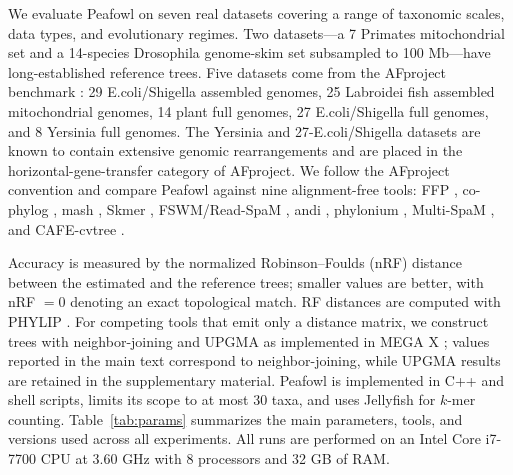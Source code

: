 \documentclass[11pt]{article}
\begin{document}
We evaluate Peafowl on seven real datasets covering a range of taxonomic
scales, data types, and evolutionary regimes. Two datasets---a 7 Primates
mitochondrial set and a 14-species Drosophila genome-skim set subsampled to
100 Mb---have long-established reference trees. Five datasets come from the
AFproject benchmark \citep{zielezinski2019afproject}: 29 E.coli/Shigella
assembled genomes, 25 Labroidei fish assembled mitochondrial genomes, 14
plant full genomes, 27 E.coli/Shigella full genomes, and 8 Yersinia full
genomes. The Yersinia and 27-E.coli/Shigella datasets are known to contain
extensive genomic rearrangements and are placed in the horizontal-gene-transfer
category of AFproject. We follow the AFproject convention and compare Peafowl
against nine alignment-free tools: FFP \citep{sims2009ffp}, co-phylog
\citep{yi2013cophylog}, mash \citep{ondov2016mash}, Skmer
\citep{sarmashghi2019skmer}, FSWM/Read-SpaM \citep{lau2019readspam}, andi
\citep{haubold2015andi}, phylonium \citep{klotzl2020phylonium}, Multi-SpaM
\citep{dencker2020multispam}, and CAFE-cvtree \citep{lu2017cafe, gao2007cvtree}.

Accuracy is measured by the normalized Robinson--Foulds (nRF) distance
\citep{robinson1981rf} between the estimated and the reference trees;
smaller values are better, with nRF $= 0$ denoting an exact topological
match. RF distances are computed with PHYLIP \citep{felsenstein1989phylip}.
For competing tools that emit only a distance matrix, we construct trees
with neighbor-joining \citep{saitou1987nj} and UPGMA \citep{sokal1958upgma}
as implemented in MEGA X \citep{kumar2018megax}; values reported in the
main text correspond to neighbor-joining, while UPGMA results are retained
in the supplementary material. Peafowl is implemented in C++ and shell
scripts, limits its scope to at most 30 taxa, and uses Jellyfish for
$k$-mer counting. Table~\ref{tab:params} summarizes the main parameters,
tools, and versions used across all experiments. All runs are performed
on an Intel Core i7-7700 CPU at 3.60 GHz with 8 processors and 32 GB of
RAM.
\end{document}
